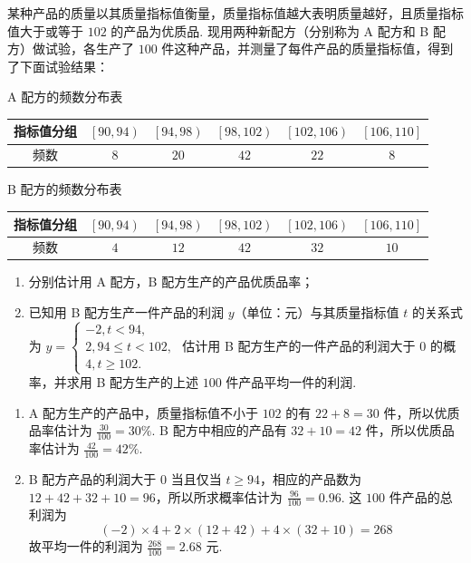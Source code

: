 \begin{problem}
某种产品的质量以其质量指标值衡量，质量指标值越大表明质量越好，且质量指标值大于或等于 \(102\) 的产品为优质品. 现用两种新配方（分别称为 A 配方和 B 配方）做试验，各生产了 \(100\) 件这种产品，并测量了每件产品的质量指标值，得到了下面试验结果：

\begin{center}
A 配方的频数分布表

\begin{tabular}{c|ccccc}
\hline
指标值分组 & \(\left[90,94\right)\) & \(\left[94,98\right)\) & \(\left[98,102\right)\) & \(\left[102,106\right)\) & \(\left[106,110\right]\) \\
\hline
频数 & \(8\) & \(20\) & \(42\) & \(22\) & \(8\) \\
\hline
\end{tabular}

B 配方的频数分布表

\begin{tabular}{c|ccccc}
\hline
指标值分组 & \(\left[90,94\right)\) & \(\left[94,98\right)\) & \(\left[98,102\right)\) & \(\left[102,106\right)\) & \(\left[106,110\right]\) \\
\hline
频数 & \(4\) & \(12\) & \(42\) & \(32\) & \(10\) \\
\hline
\end{tabular}
\end{center}

\begin{enumerate}
\item 分别估计用 A 配方，B 配方生产的产品优质品率；
\item 已知用 B 配方生产一件产品的利润 \(y\)（单位：元）与其质量指标值 \(t\) 的关系式为 \(y = \begin{cases}
-2,  t < 94,\\
2,  94 \leqslant t < 102,\\
4,  t \geqslant 102.
\end{cases}\)
估计用 B 配方生产的一件产品的利润大于 \(0\) 的概率，并求用 B 配方生产的上述 \(100\) 件产品平均一件的利润.
\end{enumerate}
\end{problem}

\begin{solution}
\begin{enumerate}
\item A 配方生产的产品中，质量指标值不小于 \(102\) 的有 \(22+8=30\) 件，所以优质品率估计为 \(\frac{30}{100}=30\%\). B 配方中相应的产品有 \(32+10=42\) 件，所以优质品率估计为 \(\frac{42}{100}=42\%\).
\item B 配方产品的利润大于 \(0\) 当且仅当 \(t\geqslant94\)，相应的产品数为 \(12+42+32+10=96\)，所以所求概率估计为 \(\frac{96}{100}=0.96\). 这 \(100\) 件产品的总利润为
\[
(-2)\times4+2\times(12+42)+4\times(32+10)=268
\]
故平均一件的利润为 \(\frac{268}{100}=2.68\) 元.
\end{enumerate}
\end{solution}

